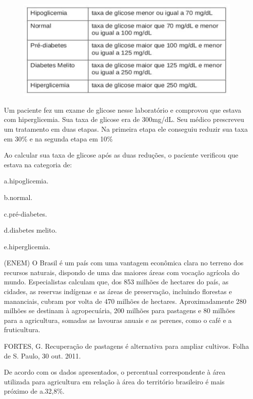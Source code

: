 \begin{multicols*}{2}
		      \begin{figure}[H]
			      \centering
			      \includegraphics[width=\columnwidth]{assets/glicemia.png}
		      \end{figure}

		      Um paciente fez um exame de glicose nesse laboratório e comprovou que estava com hiperglicemia. Sua taxa de
		      glicose era de 300mg/dL. Seu médico prescreveu um tratamento em duas etapas. Na primeira etapa ele
		      conseguiu reduzir sua taxa em 30\% e na segunda etapa em 10\%

		      Ao calcular sua taxa de glicose após as duas reduções, o paciente verificou que estava na categoria de:

		      a.hipoglicemia.

		      b.normal.

		      c.pré-diabetes.

		      d.diabetes melito.

		      e.hiperglicemia.


		\execnum (ENEM) O Brasil é um país com uma vantagem econômica clara no terreno dos recursos naturais, dispondo de uma das maiores áreas com vocação agrícola do mundo. Especialistas calculam que, dos 853 milhões de hectares do país, as cidades, as reservas indígenas e as áreas de preservação, incluindo florestas e mananciais, cubram por volta de 470 milhões de hectares. Aproximadamente 280 milhões se destinam à agropecuária, 200 milhões para pastagens e 80 milhões para a agricultura, somadas as lavouras anuais e as perenes, como o café e a fruticultura.

		      FORTES, G. Recuperação de pastagens é alternativa para ampliar cultivos. Folha de S. Paulo, 30 out. 2011.

		      De acordo com os dados apresentados, o percentual correspondente à área utilizada para agricultura em relação à área do território brasileiro é mais próximo de a.32,8\%.


\end{multicols*}
